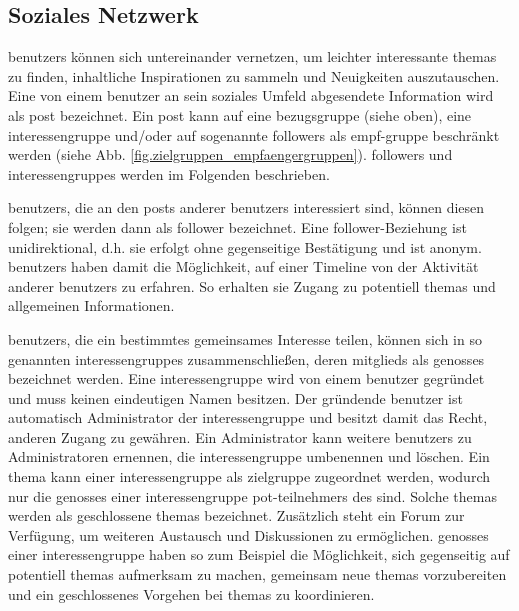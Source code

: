 \documentclass[10pt]{article}
\begin{document}
\subsection{Soziales Netzwerk}

\glspl{benutzer} können sich untereinander vernetzen, um leichter interessante \glspl{thema} zu finden, inhaltliche Inspirationen zu sammeln und Neuigkeiten auszutauschen. Eine von einem \gls{benutzer} an sein soziales Umfeld abgesendete Information wird als \gls{post} bezeichnet. Ein \gls{post} kann auf eine \gls{bezugsgruppe} (siehe oben), eine \gls{interessengruppe} und/oder auf sogenannte \glspl{follower} als \gls{empf-gruppe} beschränkt werden (siehe Abb. \ref{fig.zielgruppen_empfaengergruppen}). \glspl{follower} und \glspl{interessengruppe} werden im Folgenden beschrieben.

\glspl{benutzer}, die an den \glspl{post} anderer \glspl{benutzer} interessiert sind, können diesen folgen; sie werden dann als \gls{follower} bezeichnet. Eine \gls{follower}-Beziehung ist unidirektional, d.h. sie erfolgt ohne gegenseitige Bestätigung und ist anonym. \glspl{benutzer} haben damit die Möglichkeit, auf einer Timeline von der Aktivität anderer \glspl{benutzer} zu erfahren. So erhalten sie Zugang zu potentiell  \glspl{thema} und allgemeinen Informationen.

\glspl{benutzer}, die ein bestimmtes gemeinsames Interesse teilen, können sich in so genannten \glspl{interessengruppe} zusammenschließen, deren \glspl{mitglied} als \glspl{genosse} bezeichnet werden. Eine \gls{interessengruppe} wird von einem \gls{benutzer} gegründet und muss keinen eindeutigen Namen besitzen. Der gründende \gls{benutzer} ist automatisch Administrator der \gls{interessengruppe} und besitzt damit das Recht, anderen  Zugang zu gewähren. Ein Administrator kann weitere \glspl{benutzer} zu Administratoren ernennen, die \gls{interessengruppe} umbenennen und löschen. Ein \gls{thema} kann einer \gls{interessengruppe} als \gls{zielgruppe} zugeordnet werden, wodurch nur die \glspl{genosse} einer \gls{interessengruppe} \glspl{pot-teilnehmer} des  sind. Solche \glspl{thema} werden als geschlossene \glspl{thema} bezeichnet. Zusätzlich steht ein Forum zur Verfügung, um weiteren Austausch und Diskussionen zu ermöglichen. \glspl{genosse} einer \gls{interessengruppe} haben so zum Beispiel die Möglichkeit, sich gegenseitig auf potentiell  \glspl{thema} aufmerksam zu machen, gemeinsam neue \glspl{thema} vorzubereiten und ein geschlossenes Vorgehen bei \glspl{thema} zu koordinieren.
\end{document}
